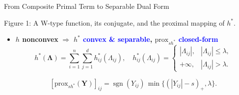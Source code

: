 \documentclass[mathserif,compress,override,9pt]{beamer}
\numberwithin{equation}{section}
\newcommand{\prox}{\mathrm{prox}}
\newcommand{\bx}{\bm{x}}
\newcommand{\bD}{\bm{D}}
\newcommand{\bY}{\bm{Y}}
\newcommand{\bLmbd}{\bm{\Lambda}}
\newcommand{\blue}[1]{\textcolor{blue}{#1}}
\theoremstyle{remark}
\begin{document}
\begin{frame}[t]{From Composite Primal Term to Separable Dual Form}
\begin{center}
\end{center}
\vspace{-0.2cm}
\begin{center}
\footnotesize Figure 1: A W-type function, its conjugate, and the proximal mapping of $h^*$.
\end{center}

\vspace{0.5cm}

\begin{itemize}
\setlength{\itemsep}{0.04cm}
\item \textbf{$h$ nonconvex}
\(\Longrightarrow\)
\textbf{$h^*$ \blue{convex \& separable}, $\prox_{s h^*}$ \blue{closed-form}}
\vspace{0.24cm}
\[
h^*(\bLmbd)=\sum_{i=1}^n\sum_{j=1}^d h_{ij}^*(\Lambda_{ij}),
\quad
h_{ij}^*(\Lambda_{ij})
=
\begin{cases}
|\Lambda_{ij}|, & |\Lambda_{ij}|\le \lambda,\\
+\infty, & |\Lambda_{ij}|>\lambda.
\end{cases}
\]

\vspace{-0.1cm}

\[
[\prox_{s h^*}(\bY)]_{ij}
=
\operatorname{sgn}(Y_{ij})\,
\min\big\{(|Y_{ij}|-s)_+,\lambda\big\}.
\]
\end{itemize}

\end{frame}
\end{document}
